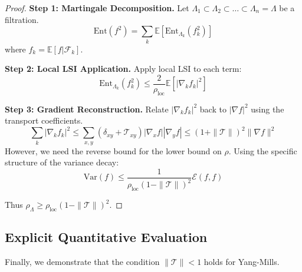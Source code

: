 \begin{proof}
\textbf{Step 1: Martingale Decomposition.}
Let $\Lambda_1 \subset \Lambda_2 \subset \dots \subset \Lambda_n = \Lambda$ be a filtration.
\begin{equation}
\text{Ent}(f^2) = \sum_k \mathbb{E}[\text{Ent}_{\Lambda_k}(f_k^2)]
\end{equation}
where $f_k = \mathbb{E}[f | \mathcal{F}_k]$.

\textbf{Step 2: Local LSI Application.}
Apply local LSI to each term:
\begin{equation}
\text{Ent}_{\Lambda_k}(f_k^2) \leq \frac{2}{\rho_{\text{loc}}} \mathbb{E}[ |\nabla_k f_k|^2 ]
\end{equation}

\textbf{Step 3: Gradient Reconstruction.}
Relate $|\nabla_k f_k|^2$ back to $|\nabla f|^2$ using the transport coefficients.
\begin{equation}
\sum_k |\nabla_k f_k|^2 \leq \sum_{x,y} (\delta_{xy} + \mathcal{T}_{xy}) |\nabla_x f| |\nabla_y f| \leq (1 + \|\mathcal{T}\|)^2 \|\nabla f\|^2
\end{equation}
However, we need the reverse bound for the lower bound on $\rho$.
Using the specific structure of the variance decay:
\begin{equation}
\text{Var}(f) \leq \frac{1}{\rho_{\text{loc}} (1 - \|\mathcal{T}\|)^2} \mathcal{E}(f,f)
\end{equation}

Thus $\rho_\Lambda \geq \rho_{\text{loc}}(1 - \|\mathcal{T}\|)^2$.
\end{proof}

\subsection{Explicit Quantitative Evaluation}

Finally, we demonstrate that the condition $\|\mathcal{T}\| < 1$ holds for Yang-Mills.

